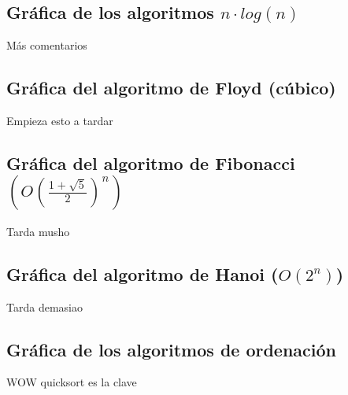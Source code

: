 \documentclass[a4paper, 11pt]{article}
\begin{document}
\subsection{Gráfica de los algoritmos $n\cdot log(n)$ }
Más comentarios

\subsection{Gráfica del algoritmo de Floyd (cúbico)}
Empieza esto a tardar

\subsection{Gráfica del algoritmo de Fibonacci $(O(\frac{1+\sqrt{5}}{2})^n)$}

Tarda musho

\subsection{Gráfica del algoritmo de Hanoi ($O(2^n)$)}

Tarda demasiao


\subsection{Gráfica de los algoritmos de ordenación}

WOW quicksort es la clave
\end{document}
